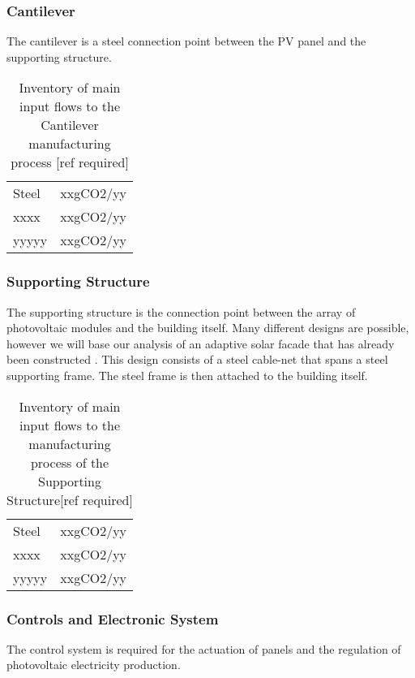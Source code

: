 \subsubsection*{Cantilever}
The cantilever is a steel connection point between the PV panel and the supporting structure.\\

\begin{table}[H]
\centering
\begin{tabular}{ll}
\hline
Steel & xxgCO2/yy \\
xxxx  & xxgCO2/yy \\
yyyyy & xxgCO2/yy \\
\hline
\end{tabular}
\caption{Inventory of main input flows to the Cantilever manufacturing process [ref required]}
\label{tab:CantileverInv}
\end{table}

\subsubsection*{Supporting Structure}
The supporting structure is the connection point between the array of photovoltaic modules and the building itself. Many different designs are possible, however we will base our analysis of an adaptive solar facade that has already been constructed \cite{nagy2015frontiers}. This design consists of a steel cable-net that spans a steel supporting frame. The steel frame is then attached to the building itself.\\

\begin{table}[H]
\centering
\begin{tabular}{ll}
\hline
Steel & xxgCO2/yy \\
xxxx  & xxgCO2/yy \\
yyyyy & xxgCO2/yy \\
\hline
\end{tabular}
\caption{Inventory of main input flows to the manufacturing process of the Supporting Structure[ref required]}
\label{tab:StructureInv}
\end{table}

\subsubsection*{Controls and Electronic System}
The control system is required for the actuation of panels and the regulation of photovoltaic electricity production.\\

